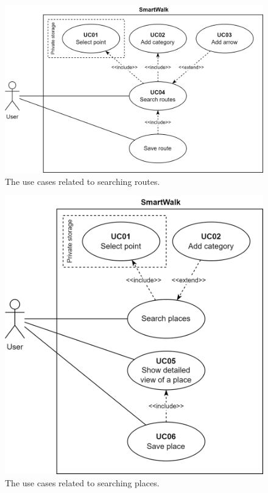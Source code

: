 \clearpage

\begin{figure}
\centering
\includegraphics[width=1.00\linewidth]{img/analysis/uc-search-routes.png}
\caption{The use cases related to searching routes.}
\label{fig:uc-search-routes}
\end{figure}

\begin{figure}
\centering
\includegraphics[width=0.75\linewidth]{img/analysis/uc-search-places.png}
\caption{The use cases related to searching places.}
\label{fig:uc-search-places}
\end{figure}

\clearpage

